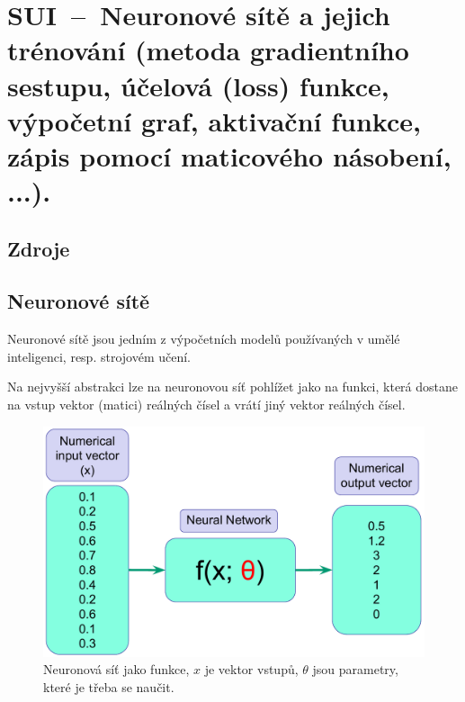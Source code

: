

\graphicspath{{sui/neuronove_site_a_jejich_trenovani/figures}}


\chapter{SUI~--~Neuronové sítě a jejich trénování (metoda gradientního sestupu, účelová (loss) funkce, výpočetní graf, aktivační funkce, zápis pomocí maticového násobení, ...).}


\section{Zdroje}

\begin{compactitem}
    \item {}
    \item {}
    \item {}
\end{compactitem}


\section{Neuronové sítě}

\begin{compactitem}
    \item Neuronové sítě jsou jedním z výpočetních modelů používaných v umělé inteligenci, resp. strojovém učení.

    \item Na nejvyšší abstrakci lze na neuronovou síť pohlížet jako na funkci, která dostane na vstup vektor (matici) reálných čísel a vrátí jiný vektor reálných čísel.
\end{compactitem}

\begin{figure}[H]
    \centering
    \includegraphics[width=0.65\linewidth]{neural_network_high_level.pdf}
    \caption{Neuronová síť jako funkce, $x$ je vektor vstupů, $\theta$ jsou parametry, které je třeba se naučit.}
\end{figure}

